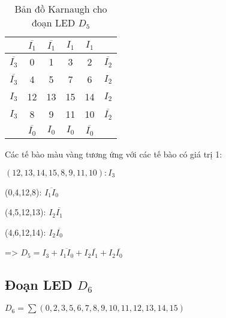 \begin{table}[H]
	\centering
	\begin{tabular}{|c|c|c|c|c|c|}
		\hline
		                   & \(\overline{I_1}\)   & \(\overline{I_1}\)   & \(I_1\)              & \(I_1\)              &                    \\
		\hline
		\(\overline{I_3}\) & \cellcolor{yellow}0  & 1                    & 3                    & 2                    & \(\overline{I_2}\) \\
		\hline
		\(\overline{I_3}\) & \cellcolor{yellow}4  & \cellcolor{yellow}5  & 7                    & \cellcolor{yellow}6  & \(I_2\)            \\
		\hline
		\(I_3\)            & \cellcolor{yellow}12 & \cellcolor{yellow}13 & \cellcolor{yellow}15 & \cellcolor{yellow}14 & \(I_2\)            \\
		\hline
		\(I_3\)            & \cellcolor{yellow}8  & \cellcolor{yellow}9  & \cellcolor{yellow}11 & \cellcolor{yellow}10 & \(\overline{I_2}\) \\
		\hline
		                   & \(\overline{I_0}\)   & \(I_0\)              & \(I_0\)              & \(\overline{I_0}\)   &                    \\
		\hline
	\end{tabular}
	\caption*{Bản đồ Karnaugh cho đoạn LED \(D_5\)}
\end{table}

Các tế bào màu vàng tương ứng với các tế bào có giá trị 1:

\((12,13,14,15,8,9,11,10): I_3\)

(0,4,12,8): \(\overline{I_1 I_0}\)

(4,5,12,13): \(I_2 \overline{I_1}\)

(4,6,12,14): \(I_2 \overline{I_0}\)

=> \(D_5 = I_3 + \overline{I_1 I_0} + I_2 \overline{I_1} + I_2 \overline{I_0}\)

\subsection{Đoạn LED \texorpdfstring{$D_6$}{D6}}

\(D_6 = \sum(0,2,3,5,6,7,8,9,10,11,12,13,14,15)\)


